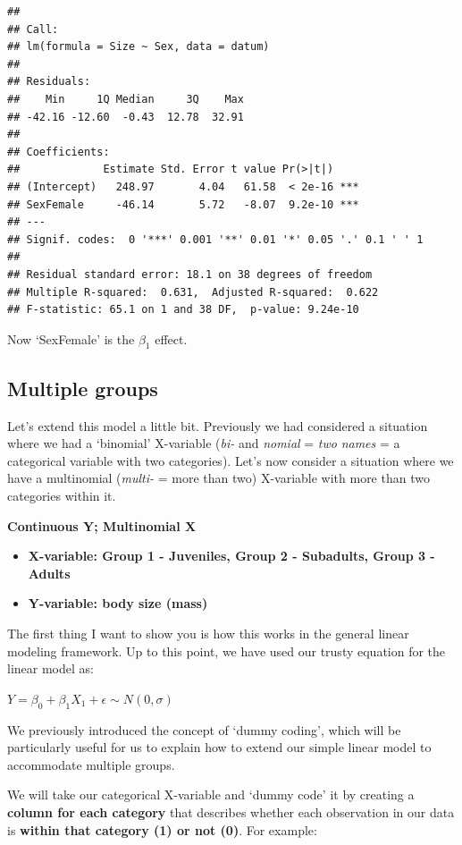 \documentclass[
]{article}
\providecommand{\tightlist}{%
  \setlength{\itemsep}{0pt}\setlength{\parskip}{0pt}}
\begin{document}
\begin{verbatim}
## 
## Call:
## lm(formula = Size ~ Sex, data = datum)
## 
## Residuals:
##    Min     1Q Median     3Q    Max 
## -42.16 -12.60  -0.43  12.78  32.91 
## 
## Coefficients:
##             Estimate Std. Error t value Pr(>|t|)    
## (Intercept)   248.97       4.04   61.58  < 2e-16 ***
## SexFemale     -46.14       5.72   -8.07  9.2e-10 ***
## ---
## Signif. codes:  0 '***' 0.001 '**' 0.01 '*' 0.05 '.' 0.1 ' ' 1
## 
## Residual standard error: 18.1 on 38 degrees of freedom
## Multiple R-squared:  0.631,  Adjusted R-squared:  0.622 
## F-statistic: 65.1 on 1 and 38 DF,  p-value: 9.24e-10
\end{verbatim}

Now `SexFemale' is the \(\beta_1\) effect.

\subsection{Multiple groups}\label{multiple-groups}

Let's extend this model a little bit. Previously we had considered a
situation where we had a `binomial' X-variable (\emph{bi-} and
\emph{nomial} = \emph{two} \emph{names} = a categorical variable with
two categories). Let's now consider a situation where we have a
multinomial (\emph{multi-} = more than two) X-variable with more than
two categories within it.

\textbf{Continuous Y; Multinomial X}

\begin{itemize}
\tightlist
\item
  \textbf{X-variable: Group 1 - Juveniles, Group 2 - Subadults, Group 3
  - Adults}
\item
  \textbf{Y-variable: body size (mass)}
\end{itemize}

The first thing I want to show you is how this works in the general
linear modeling framework. Up to this point, we have used our trusty
equation for the linear model as:

\textbf{\(Y = \beta_0 + \beta_1 X_1 + \epsilon \sim N(0, \sigma)\)}

We previously introduced the concept of `dummy coding', which will be
particularly useful for us to explain how to extend our simple linear
model to accommodate multiple groups.

We will take our categorical X-variable and `dummy code' it by creating
a \textbf{column for each category} that describes whether each
observation in our data is \textbf{within that category (1) or not (0)}.
For example:
\end{document}
